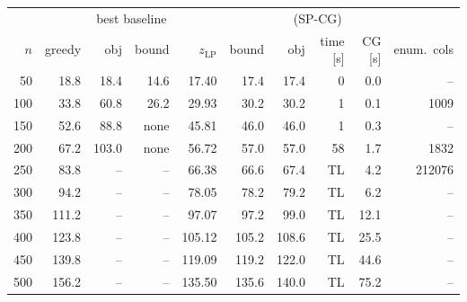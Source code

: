 \begin{tabular}{rrrrrrrrrr}
\toprule
 & & \multicolumn{2}{c}{best baseline} & \multicolumn{6}{c}{(SP-CG)} \\
\cmidrule(lr){3-4}\cmidrule(lr){5-10}
$n$ & greedy & obj & bound & $z_{\mathrm{LP}}$ & bound & obj & time [s] & CG [s] & enum.\ cols \\
\midrule
50 & 18.8 & 18.4 & 14.6 & 17.40 & 17.4 & 17.4 & 0 & 0.0 & -- \\
100 & 33.8 & 60.8 & 26.2 & 29.93 & 30.2 & 30.2 & 1 & 0.1 & 1009 \\
150 & 52.6 & 88.8 & none & 45.81 & 46.0 & 46.0 & 1 & 0.3 & -- \\
200 & 67.2 & 103.0 & none & 56.72 & 57.0 & 57.0 & 58 & 1.7 & 1832 \\
250 & 83.8 & -- & -- & 66.38 & 66.6 & 67.4 & TL & 4.2 & 212076 \\
300 & 94.2 & -- & -- & 78.05 & 78.2 & 79.2 & TL & 6.2 & -- \\
350 & 111.2 & -- & -- & 97.07 & 97.2 & 99.0 & TL & 12.1 & -- \\
400 & 123.8 & -- & -- & 105.12 & 105.2 & 108.6 & TL & 25.5 & -- \\
450 & 139.8 & -- & -- & 119.09 & 119.2 & 122.0 & TL & 44.6 & -- \\
500 & 156.2 & -- & -- & 135.50 & 135.6 & 140.0 & TL & 75.2 & -- \\
\bottomrule
\end{tabular}
